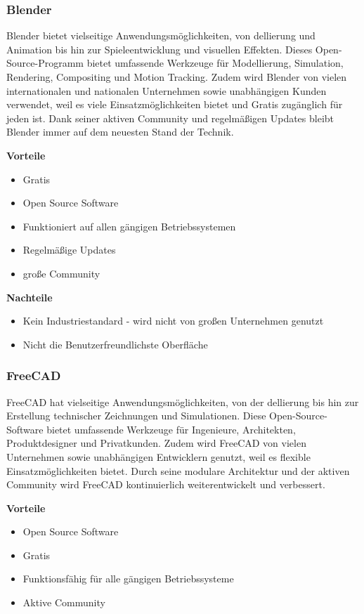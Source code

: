 \subsubsection{Blender} 
Blender bietet vielseitige Anwendungsmöglichkeiten, von dellierung und Animation bis hin zur Spieleentwicklung und visuellen Effekten. Dieses Open-Source-Programm bietet umfassende Werkzeuge für Modellierung, Simulation, Rendering, Compositing und Motion Tracking. Zudem wird Blender von vielen internationalen und nationalen Unternehmen sowie unabhängigen Kunden verwendet, weil es viele Einsatzmöglichkeiten bietet und Gratis zugänglich für jeden ist. Dank seiner aktiven Community und regelmäßigen Updates bleibt Blender immer auf dem neuesten Stand der Technik. 
\cite{Blender}

\textbf{Vorteile}
\begin{itemize}
	\item Gratis 
	\item Open Source Software
	\item Funktioniert auf allen gängigen Betriebssystemen
	\item Regelmäßige Updates
	\item große Community
\end{itemize}

\textbf{Nachteile}
\begin{itemize}
	\item Kein Industriestandard - wird nicht von großen Unternehmen genutzt
	\item Nicht die Benutzerfreundlichste Oberfläche
\end{itemize}
\cite{BlenderPros&Cons}


\subsubsection{FreeCAD}
FreeCAD hat vielseitige Anwendungsmöglichkeiten, von der dellierung bis hin zur Erstellung technischer Zeichnungen und Simulationen. Diese Open-Source-Software bietet umfassende Werkzeuge für Ingenieure, Architekten, Produktdesigner und Privatkunden. Zudem wird FreeCAD von vielen Unternehmen sowie unabhängigen Entwicklern genutzt, weil es flexible Einsatzmöglichkeiten bietet. Durch seine modulare Architektur und der aktiven Community wird FreeCAD kontinuierlich weiterentwickelt und verbessert.
\cite{FreeCAD}  \cite{FreeCAD_2}

\textbf{Vorteile}
\begin{itemize}
	\item Open Source Software
	\item Gratis
	\item Funktionsfähig für alle gängigen Betriebssysteme
	\item Aktive Community	 
\end{itemize}

